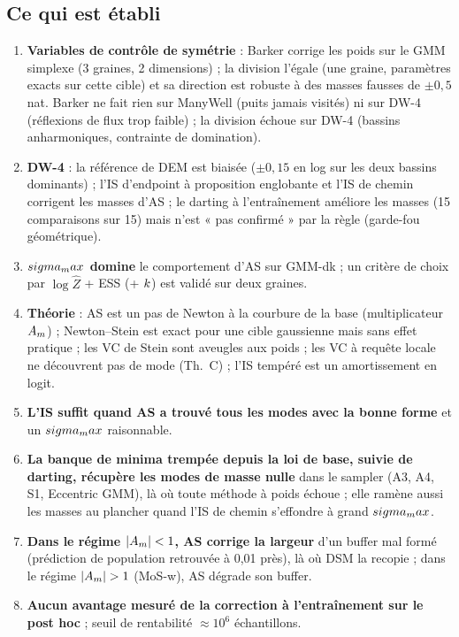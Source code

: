 \subsection{Ce qui est établi}
\begin{enumerate}
  \item \textbf{Variables de contrôle de symétrie} : Barker corrige les poids sur le GMM simplexe (3 graines, 2 dimensions) ; la division l'égale (une graine, paramètres exacts sur cette cible) et sa direction est robuste à des masses fausses de $\pm0{,}5$ nat. Barker ne fait rien sur ManyWell (puits jamais visités) ni sur DW-4 (réflexions de flux trop faible) ; la division échoue sur DW-4 (bassins anharmoniques, contrainte de domination).
  \item \textbf{DW-4} : la référence de DEM est biaisée ($\pm0{,}15$ en log sur les deux bassins dominants) ; l'IS d'endpoint à proposition englobante et l'IS de chemin corrigent les masses d'AS ; le darting à l'entraînement améliore les masses (15 comparaisons sur 15) mais n'est « pas confirmé » par la règle (garde-fou géométrique).
  \item \textbf{$sigma_max$ domine} le comportement d'AS sur GMM-dk ; un critère de choix par $\log\hat Z$ + ESS (+ $k$) est validé sur deux graines.
  \item \textbf{Théorie} : AS est un pas de Newton à la courbure de la base (multiplicateur $A_m$) ; Newton--Stein est exact pour une cible gaussienne mais sans effet pratique ; les VC de Stein sont aveugles aux poids ; les VC à requête locale ne découvrent pas de mode (Th.~C) ; l'IS tempéré est un amortissement en logit.
  \item \textbf{L'IS suffit quand AS a trouvé tous les modes avec la bonne forme} et un $sigma_max$ raisonnable.
  \item \textbf{La banque de minima trempée depuis la loi de base, suivie de darting, récupère les modes de masse nulle} dans le sampler (A3, A4, S1, Eccentric GMM), là où toute méthode à poids échoue ; elle ramène aussi les masses au plancher quand l'IS de chemin s'effondre à grand $sigma_max$.
  \item \textbf{Dans le régime $|A_m|<1$, AS corrige la largeur} d'un buffer mal formé (prédiction de population retrouvée à 0,01 près), là où DSM la recopie ; dans le régime $|\Am|>1$ (MoS-w), AS dégrade son buffer.
  \item \textbf{Aucun avantage mesuré de la correction à l'entraînement sur le post hoc} ; seuil de rentabilité $\approx10^6$ échantillons.
\end{enumerate}

